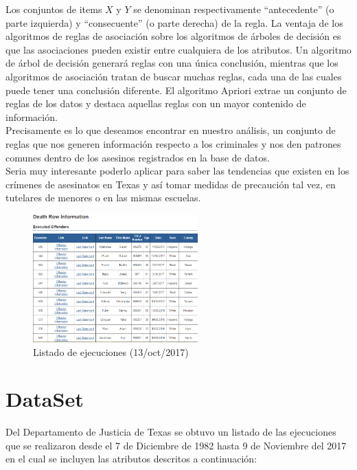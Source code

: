\documentclass[sigconf]{acmart}
\begin{document}
Los conjuntos de items $X$ y $Y$ se denominan respectivamente ``antecedente'' (o parte izquierda) y ``consecuente'' (o parte derecha) de la regla.
La ventaja de los algoritmos de reglas de asociación sobre los algoritmos de árboles de decisión es que las asociaciones pueden existir entre cualquiera de los atributos. Un algoritmo de árbol de decisión generará reglas con una única conclusión, mientras que los algoritmos de asociación tratan de buscar muchas reglas, cada una de las cuales puede tener una conclusión diferente.
El algoritmo Apriori extrae un conjunto de reglas de los datos y destaca aquellas reglas con un mayor contenido de información.\\ Precisamente es lo que deseamos encontrar en nuestro análisis, un conjunto de reglas que nos generen información respecto a los criminales y nos den patrones comunes dentro de los asesinos registrados en la base de datos.\\Seria muy interesante poderlo aplicar para saber las tendencias que existen en los crímenes de asesinatos en Texas y así tomar medidas de precaución tal vez, en tutelares de menores o en las mismas escuelas.
\begin{figure}[ht]
  \centering
  \includegraphics[width=2.5in]{d.PNG}
  \caption{Listado de ejecuciones (13/oct/2017)}
\end{figure}

\section{DataSet}
Del Departamento de Justicia de Texas se obtuvo un listado de las ejecuciones que se realizaron desde el 7 de Diciembre de 1982 hasta 9 de Noviembre del 2017 en el cual se incluyen las atributos descritos a continuación:
\end{document}
